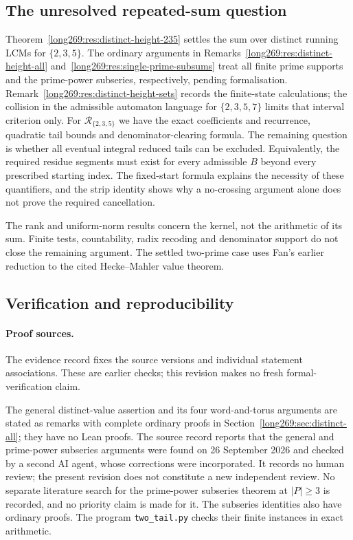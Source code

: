 \documentclass[11pt]{article}
\theoremstyle{remark}
\theoremstyle{plain}
\begin{document}
\subsection{The unresolved repeated-sum question}\label{long269:sec:remaining-question}

Theorem~\ref{long269:res:distinct-height-235} settles the sum over distinct running LCMs for $\{2,3,5\}$. The ordinary arguments in
Remarks~\ref{long269:res:distinct-height-all}
and~\ref{long269:res:single-prime-subsums} treat all finite prime supports
and the prime-power subseries, respectively, pending formalisation.
Remark~\ref{long269:res:distinct-height-sets} records the finite-state
calculations; the collision in the admissible automaton language for
$\{2,3,5,7\}$ limits that interval criterion only.
For $\mathcal R_{\{2,3,5\}}$ we have the exact coefficients and recurrence,
quadratic tail bounds and denominator-clearing formula. The remaining
question is whether all eventual integral reduced tails can be excluded.
Equivalently, the required residue segments must exist for every admissible
$B$ beyond every prescribed starting index. The fixed-start formula
explains the necessity of these quantifiers, and the strip identity shows
why a no-crossing argument alone does not prove the required cancellation.

The rank and uniform-norm results concern the kernel, not the arithmetic
of its sum.  Finite tests, countability, radix recoding and denominator
support do not close the remaining argument.  The settled two-prime case
uses Fan's earlier reduction to the cited Hecke--Mahler value theorem.

\subsection*{Verification and reproducibility}\label{long269:sec:proof-sources}

\evidenceparagraph{\evidencerecordurl}

\paragraph{Proof sources.}
The evidence record fixes the source versions and individual statement
associations. These are earlier checks; this revision makes no fresh
formal-verification claim.

The general distinct-value assertion and its four word-and-torus
arguments are stated as remarks with complete ordinary proofs in
Section~\ref{long269:sec:distinct-all}; they have no Lean proofs. The source record reports that the general and
prime-power subseries arguments were found on 26 September 2026 and checked
by a second AI agent, whose corrections were incorporated. It records
no human review; the present revision does not constitute a new independent
review. No separate literature search for the prime-power subseries theorem
at $|P|\ge3$ is recorded, and no priority claim is made for it. The
subseries identities also have ordinary proofs. The program
\texttt{two\_tail.py} checks their finite instances in exact arithmetic.
\end{document}
